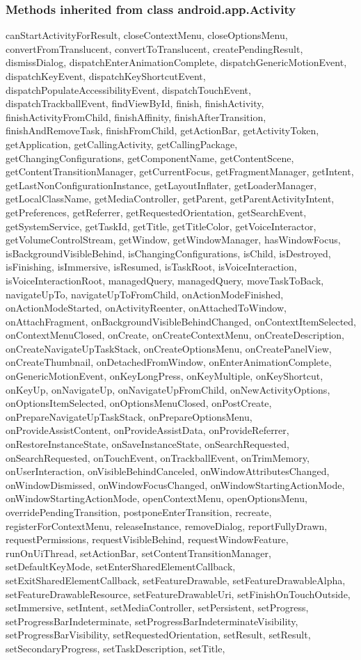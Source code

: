 \subsubsection{Methods inherited from class android.app.Activity}

canStartActivityForResult, closeContextMenu, closeOptionsMenu, convertFromTranslucent, convertToTranslucent, createPendingResult, dismissDialog, dispatchEnterAnimationComplete, dispatchGenericMotionEvent, dispatchKeyEvent, dispatchKeyShortcutEvent, dispatchPopulateAccessibilityEvent, dispatchTouchEvent, dispatchTrackballEvent, findViewById, finish, finishActivity, finishActivityFromChild, finishAffinity, finishAfterTransition, finishAndRemoveTask, finishFromChild, getActionBar, getActivityToken, getApplication, getCallingActivity, getCallingPackage, getChangingConfigurations, getComponentName, getContentScene, getContentTransitionManager, getCurrentFocus, getFragmentManager, getIntent, getLastNonConfigurationInstance, getLayoutInflater, getLoaderManager, getLocalClassName, getMediaController, getParent, getParentActivityIntent, getPreferences, getReferrer, getRequestedOrientation, getSearchEvent, getSystemService, getTaskId, getTitle, getTitleColor, getVoiceInteractor, getVolumeControlStream, getWindow, getWindowManager, hasWindowFocus, isBackgroundVisibleBehind, isChangingConfigurations, isChild, isDestroyed, isFinishing, isImmersive, isResumed, isTaskRoot, isVoiceInteraction, isVoiceInteractionRoot, managedQuery, managedQuery, moveTaskToBack, navigateUpTo, navigateUpToFromChild, onActionModeFinished, onActionModeStarted, onActivityReenter, onAttachedToWindow, onAttachFragment, onBackgroundVisibleBehindChanged, onContextItemSelected, onContextMenuClosed, onCreate, onCreateContextMenu, onCreateDescription, onCreateNavigateUpTaskStack, onCreateOptionsMenu, onCreatePanelView, onCreateThumbnail, onDetachedFromWindow, onEnterAnimationComplete, onGenericMotionEvent, onKeyLongPress, onKeyMultiple, onKeyShortcut, onKeyUp, onNavigateUp, onNavigateUpFromChild, onNewActivityOptions, onOptionsItemSelected, onOptionsMenuClosed, onPostCreate, onPrepareNavigateUpTaskStack, onPrepareOptionsMenu, onProvideAssistContent, onProvideAssistData, onProvideReferrer, onRestoreInstanceState, onSaveInstanceState, onSearchRequested, onSearchRequested, onTouchEvent, onTrackballEvent, onTrimMemory, onUserInteraction, onVisibleBehindCanceled, onWindowAttributesChanged, onWindowDismissed, onWindowFocusChanged, onWindowStartingActionMode, onWindowStartingActionMode, openContextMenu, openOptionsMenu, overridePendingTransition, postponeEnterTransition, recreate, registerForContextMenu, releaseInstance, removeDialog, reportFullyDrawn, requestPermissions, requestVisibleBehind, requestWindowFeature, runOnUiThread, setActionBar, setContentTransitionManager, setDefaultKeyMode, setEnterSharedElementCallback, setExitSharedElementCallback, setFeatureDrawable, setFeatureDrawableAlpha, setFeatureDrawableResource, setFeatureDrawableUri, setFinishOnTouchOutside, setImmersive, setIntent, setMediaController, setPersistent, setProgress, setProgressBarIndeterminate, setProgressBarIndeterminateVisibility, setProgressBarVisibility, setRequestedOrientation, setResult, setResult, setSecondaryProgress, setTaskDescription, setTitle, 